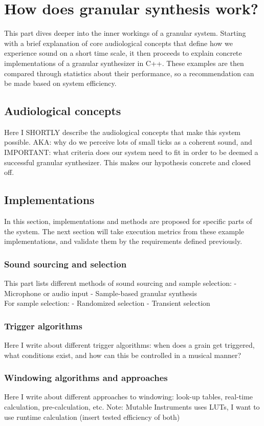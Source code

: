 \documentclass[10pt, twocolumn]{IEEEtran}
\begin{document}
\section{How does granular synthesis work?}
This part dives deeper into the inner workings of a granular system. Starting with a brief explanation of core audiological concepts that define how we experience sound on a short time scale, it then proceeds to explain concrete implementations of a granular synthesizer in C++. These examples are then compared through statistics about their performance, so a recommendation can be made based on system efficiency.

\subsection{Audiological concepts}
Here I SHORTLY describe the audiological concepts that make this system possible. AKA: why do we perceive lots of small ticks as a coherent sound, and IMPORTANT: what criteria does our system need to fit in order to be deemed a successful granular synthesizer. This makes our hypothesis concrete and closed off.
\subsection{Implementations}
In this section, implementations and methods are proposed for specific parts of the system. The next section will take execution metrics from these example implementations, and validate them by the requirements defined previously.
\subsubsection{Sound sourcing and selection}
This part lists different methods of sound sourcing and sample selection:
- Microphone or audio input
- Sample-based granular synthesis\\
For sample selection:
- Randomized selection
- Transient selection
\subsubsection{Trigger algorithms}
Here I write about different trigger algorithms: when does a grain get triggered, what conditions exist, and how can this be controlled in a musical manner?
\subsubsection{Windowing algorithms and approaches}
Here I write about different approaches to windowing: look-up tables, real-time calculation, pre-calculation, etc.
Note: Mutable Instruments uses LUTs, I want to use runtime calculation (insert tested efficiency of both)
\end{document}
